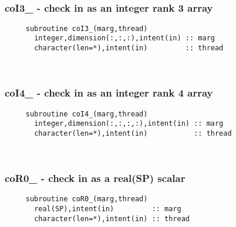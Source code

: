  
\mbox{}\hrulefill\ 
 
  \subsubsection{coI3\_ - check in as an integer rank 3 array}

\begin{verbatim} 
     subroutine coI3_(marg,thread)
       integer,dimension(:,:,:),intent(in) :: marg
       character(len=*),intent(in)         :: thread
 \end{verbatim}%
 
 
\mbox{}\hrulefill\ 
 
  \subsubsection{coI4\_ - check in as an integer rank 4 array}
  
\begin{verbatim} 
     subroutine coI4_(marg,thread)
       integer,dimension(:,:,:,:),intent(in) :: marg
       character(len=*),intent(in)           :: thread
 \end{verbatim}%
 
 
\mbox{}\hrulefill\ 
 
  \subsubsection{coR0\_ - check in as a real(SP) scalar}

\begin{verbatim} 
     subroutine coR0_(marg,thread)
       real(SP),intent(in)         :: marg
       character(len=*),intent(in) :: thread
 \end{verbatim}%
 
